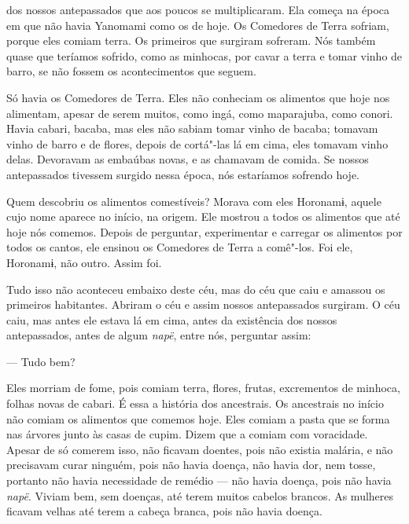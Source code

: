  

 

 dos nossos antepassados que aos poucos se
multiplicaram. Ela começa na época em que não havia Yanomami como os de
hoje. Os Comedores de Terra sofriam, porque eles comiam terra. Os
primeiros que surgiram sofreram. Nós também quase que teríamos sofrido,
como as minhocas, por cavar a terra e tomar vinho de barro, se não
fossem os acontecimentos que seguem. 

Só havia os Comedores de Terra. Eles não conheciam os alimentos que hoje
nos alimentam, apesar de serem muitos, como ingá, como maparajuba,
como conori. Havia cabari, bacaba, mas eles não sabiam tomar vinho de
bacaba; tomavam vinho de barro e de flores, depois de cortá"-las lá em
cima, eles tomavam vinho delas. Devoravam as embaúbas novas, e as
chamavam de comida. Se nossos antepassados tivessem surgido nessa época,
nós estaríamos sofrendo hoje. 

Quem descobriu os alimentos comestíveis? Morava com eles Horonamɨ,
aquele cujo nome aparece no início, na origem. Ele mostrou a todos os
alimentos que até hoje nós comemos. Depois de perguntar, experimentar e
carregar os alimentos por todos os cantos, ele ensinou os Comedores de
Terra a comê"-los. Foi ele, Horonamɨ, não outro. Assim foi.

Tudo isso não aconteceu embaixo deste céu, mas do céu que caiu e amassou
os primeiros habitantes. Abriram o céu e assim nossos antepassados
surgiram. O céu caiu, mas antes ele estava lá em cima, antes da
existência dos nossos antepassados, antes de algum \emph{napë}, entre
nós, perguntar assim:

--- Tudo bem? 

Eles morriam de fome, pois comiam terra, flores, frutas,
excrementos de minhoca, folhas novas de cabari. É essa a história dos
ancestrais. Os ancestrais no início não comiam os alimentos que comemos
hoje. Eles comiam a pasta que se forma nas árvores junto às casas de
cupim. Dizem que a comiam com voracidade. Apesar de só comerem isso, não
ficavam doentes, pois não existia malária, e não precisavam curar
ninguém, pois não havia doença, não havia dor, nem tosse, portanto não
havia necessidade de remédio --- não havia doença, pois não
havia \emph{napë}. Viviam bem, sem doenças, até terem muitos cabelos
brancos. As mulheres ficavam velhas até terem a cabeça branca, pois não
havia doença. 

